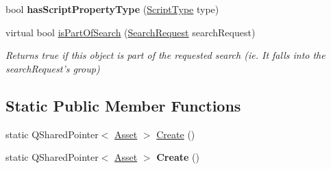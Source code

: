 \begin{DoxyCompactItemize}
\item 
\hypertarget{class_picto_1_1_analysis_script_holder_ab70342310801b98348c0eb44b02531a5}{bool {\bfseries has\-Script\-Property\-Type} (\hyperlink{class_picto_1_1_analysis_script_holder_adb6ac71422633de2c46dc223551338d8}{Script\-Type} type)}\label{class_picto_1_1_analysis_script_holder_ab70342310801b98348c0eb44b02531a5}

\item 
virtual bool \hyperlink{class_picto_1_1_analysis_script_holder_a4ade6ad76bbce6806f1f3bb31823b26b}{is\-Part\-Of\-Search} (\hyperlink{struct_search_request}{Search\-Request} search\-Request)
\begin{DoxyCompactList}\small\item\em Returns true if this object is part of the requested search (ie. It falls into the search\-Request's group) \end{DoxyCompactList}\end{DoxyCompactItemize}
\subsection*{Static Public Member Functions}
\begin{DoxyCompactItemize}
\item 
static Q\-Shared\-Pointer$<$ \hyperlink{class_picto_1_1_asset}{Asset} $>$ \hyperlink{class_picto_1_1_analysis_script_holder_af065bdc2608f64a8abce333853246ddd}{Create} ()
\item 
\hypertarget{class_picto_1_1_analysis_script_holder_a55093672a32488a2c8a7b6f9230eaf95}{static Q\-Shared\-Pointer$<$ \hyperlink{class_picto_1_1_asset}{Asset} $>$ {\bfseries Create} ()}\label{class_picto_1_1_analysis_script_holder_a55093672a32488a2c8a7b6f9230eaf95}

\end{DoxyCompactItemize}
